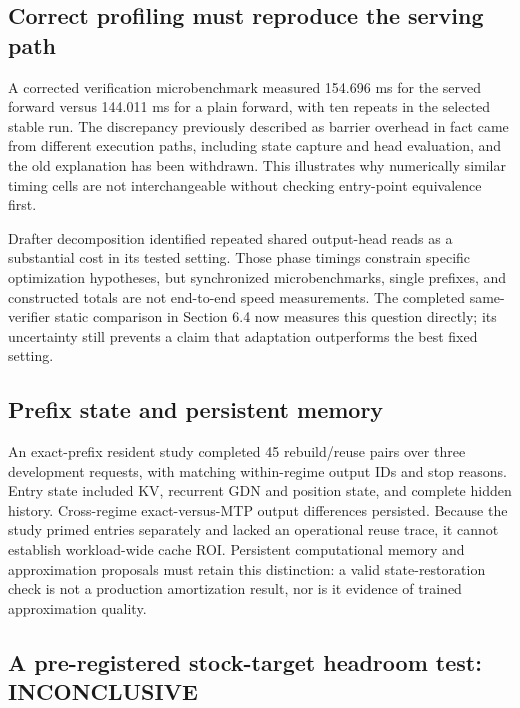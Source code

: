 \documentclass[
  11pt,
]{article}
\begin{document}
\subsection{Correct profiling must reproduce the serving
path}\label{correct-profiling-must-reproduce-the-serving-path}

A corrected verification microbenchmark measured 154.696 ms for the
served forward versus 144.011 ms for a plain forward, with ten repeats
in the selected stable run. The discrepancy previously described as
barrier overhead in fact came from different execution paths, including
state capture and head evaluation, and the old explanation has been
withdrawn. This illustrates why numerically similar timing cells are not
interchangeable without checking entry-point equivalence first.

Drafter decomposition identified repeated shared output-head reads as a
substantial cost in its tested setting. Those phase timings constrain
specific optimization hypotheses, but synchronized microbenchmarks,
single prefixes, and constructed totals are not end-to-end speed
measurements. The completed same-verifier static comparison in Section
6.4 now measures this question directly; its uncertainty still prevents
a claim that adaptation outperforms the best fixed setting.

\subsection{Prefix state and persistent
memory}\label{prefix-state-and-persistent-memory}

An exact-prefix resident study completed 45 rebuild/reuse pairs over
three development requests, with matching within-regime output IDs and
stop reasons. Entry state included KV, recurrent GDN and position state,
and complete hidden history. Cross-regime exact-versus-MTP output
differences persisted. Because the study primed entries separately and
lacked an operational reuse trace, it cannot establish workload-wide
cache ROI. Persistent computational memory and approximation proposals
must retain this distinction: a valid state-restoration check is not a
production amortization result, nor is it evidence of trained
approximation quality.

\subsection{A pre-registered stock-target headroom test:
INCONCLUSIVE}\label{a-pre-registered-stock-target-headroom-test-inconclusive}
\end{document}
